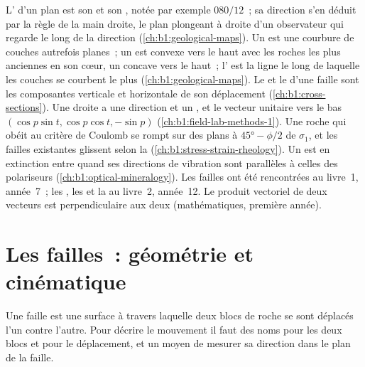 \begin{recall}
L' d'un plan est son  et son , notée par exemple
$080/12$~; sa direction s'en déduit par la règle de la main droite, le plan plongeant à
droite d'un observateur qui regarde le long de la direction (\cref{ch:b1:geological-maps}).
Un  est une courbure de couches autrefois planes~; un  est convexe vers le haut avec
les roches les plus anciennes en son cœur, un  concave vers le haut~; l' est la
ligne le long de laquelle les couches se courbent le plus (\cref{ch:b1:geological-maps}). Le
 et le  d'une faille sont les composantes verticale et horizontale de son
déplacement (\cref{ch:b1:cross-sections}). Une droite a une direction et un ,
et le vecteur unitaire vers le bas $(\cos p\sin t, \cos p\cos t, -\sin p)$
(\cref{ch:b1:field-lab-methods-1}). Une roche qui obéit au critère de Coulomb
se rompt sur des plans à $\ang{45} - \phi/2$ de $\sigma_1$, et les failles existantes
glissent selon la  (\cref{ch:b1:stress-strain-rheology}). Un
 est en extinction entre  quand ses directions de vibration
sont parallèles à celles des polariseurs (\cref{ch:b1:optical-mineralogy}). Les failles
ont été rencontrées au livre~1, année~7~; les , les  et la  au livre~2,
année~12. Le produit vectoriel de deux vecteurs est perpendiculaire aux deux
(mathématiques, première année).
\end{recall}

\section{Les failles~: géométrie et cinématique}\label{sec:b1:faults-folds-fabrics:faults}

Une faille est une surface à travers laquelle deux blocs de roche se sont déplacés l'un
contre l'autre. Pour décrire le mouvement il faut des noms pour les deux blocs et pour le
déplacement, et un moyen de mesurer sa direction dans le plan de la
faille.

